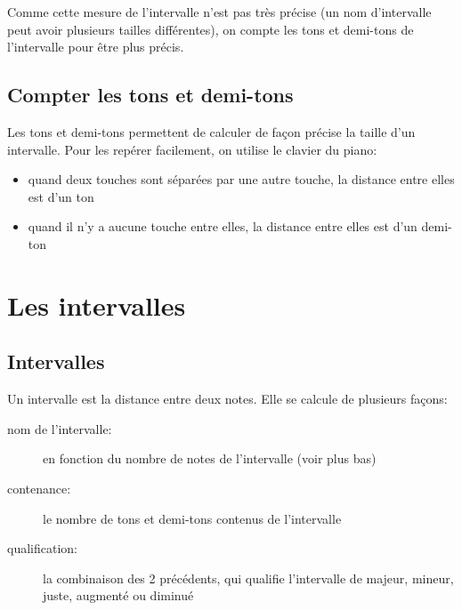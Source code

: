 Comme cette mesure de l'intervalle n'est pas très précise (un nom d'intervalle peut avoir plusieurs tailles différentes), on compte les tons et demi-tons de l'intervalle pour être plus précis.

\section{Compter les tons et demi-tons}
Les tons et demi-tons permettent de calculer de façon précise la taille d'un intervalle. Pour les repérer facilement, on utilise le clavier du piano:

\begin{itemize}
\item quand deux touches sont séparées par une autre touche, la distance entre elles est d'un ton
\item quand il n'y a aucune touche entre elles, la distance entre elles est d'un demi-ton
\end{itemize}

\begin{center}

\end{center}


\chapter{Les intervalles}
\section{Intervalles}
Un intervalle est la distance entre deux notes. Elle se calcule de plusieurs façons:
\begin{description}
\item[nom de l'intervalle:] en fonction du nombre de notes de l'intervalle (voir plus bas) 
\item[contenance:] le nombre de tons et demi-tons contenus de l'intervalle
\item[qualification:] la combinaison des 2 précédents, qui qualifie l'intervalle de majeur, mineur, juste, augmenté ou diminué
\end{description}

